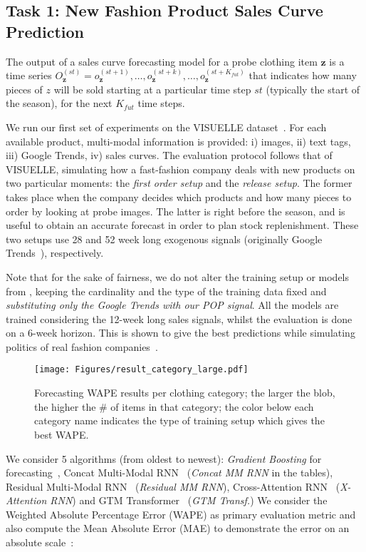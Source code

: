 \documentclass[runningheads]{llncs}
\newcommand{\snamebig}[0] {POP\xspace}
\begin{document}
\subsection{Task 1: New Fashion Product Sales Curve Prediction}\label{subsec:task1}
The output of a sales curve forecasting model for a probe clothing item $\mathbf{z}$ is a time series
$O^{(st)}_\mathbf{z}=o^{(st+1)}_\mathbf{z},\ldots,o^{(st+k)}_\mathbf{z},\ldots,o^{(st+K_{fut})}_\mathbf{z}$ that indicates how many pieces of $z$ will be sold starting at a particular time step $st$ (typically the start of the season), for the next $K_{fut}$ time steps.

We run our first set of experiments on the VISUELLE dataset~\cite{skenderi2021well}. For each available product, multi-modal information is provided: i) images, ii) text tags, iii) Google Trends, iv) sales curves. The evaluation protocol follows that of VISUELLE, simulating how a fast-fashion company deals with new products on two particular moments: the \emph{first order setup} and the \emph{release setup}. The former takes place when the company decides which products and how many pieces to order by looking at probe images. The latter is right before the season, and is useful to obtain an accurate forecast in order to plan stock replenishment. These two setups use 28 and 52 week long exogenous signals (originally Google Trends~\cite{skenderi2021well}), respectively.

Note that for the sake of fairness, we do not alter the training setup or models from \cite{skenderi2021well}, keeping the cardinality and the type of the training data fixed and \emph{substituting only the Google Trends with our \snamebig signal}. All the models are trained considering the 12-week long sales signals, whilst the evaluation is done on a 6-week horizon. This is shown to give the best predictions while simulating politics of real fashion companies~\cite{skenderi2021well}.


\begin{figure}
\centering
    \texttt{[image: Figures/result\_category\_large.pdf]}
\caption{\footnotesize Forecasting WAPE results per clothing category; the larger the blob, the higher the \# of items in that category; the color below each category name indicates the type of training setup which gives the best WAPE.}
    \label{fig:result_categories}
\end{figure}

We consider 5 algorithms (from oldest to newest): \emph{Gradient Boosting} for forecasting~\cite{ilic2021explainable}, Concat Multi-Modal RNN~\cite{ekambaram_attention_2020}  (\emph{Concat MM RNN} in the tables),  Residual Multi-Modal RNN~\cite{ekambaram_attention_2020} (\emph{Residual MM RNN}), Cross-Attention RNN~\cite{ekambaram_attention_2020} (\emph{X-Attention RNN}) and GTM Transformer~\cite{skenderi2021well} (\emph{GTM Transf.}) We consider the Weighted Absolute Percentage Error (WAPE) as primary evaluation metric and also compute the Mean Absolute Error (MAE) to demonstrate the error on an absolute scale~\cite{skenderi2021well}:
\end{document}
